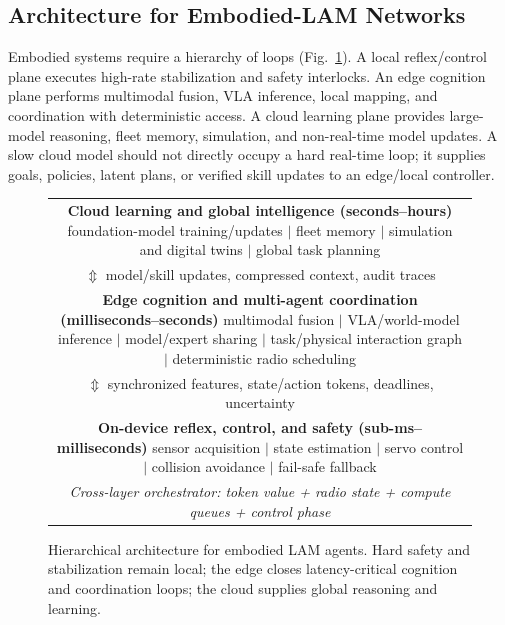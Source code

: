 \documentclass[letterpaper,journal]{IEEEtran}
\begin{document}
\subsection{Architecture for Embodied-LAM Networks}
Embodied systems require a hierarchy of loops (Fig.~\ref{fig:architecture}).
A local reflex/control plane executes high-rate stabilization and safety
interlocks. An edge cognition plane performs multimodal fusion, VLA inference,
local mapping, and coordination with deterministic access. A cloud learning
plane provides large-model reasoning, fleet memory, simulation, and
non-real-time model updates. A slow cloud model should not directly occupy a
hard real-time loop; it supplies goals, policies, latent plans, or verified
skill updates to an edge/local controller.

\begin{figure}[t]
\centering
\setlength{\tabcolsep}{3pt}
\renewcommand{\arraystretch}{1.2}
\begin{tabular}{c}
\fbox{\parbox{0.88\textwidth}{\centering
\textbf{Cloud learning and global intelligence (seconds--hours)}\\
foundation-model training/updates $\mid$ fleet memory $\mid$ simulation and
digital twins $\mid$ global task planning}}\\[-1pt]
$\Updownarrow$ \small model/skill updates, compressed context, audit traces\\[-1pt]
\fbox{\parbox{0.88\textwidth}{\centering
\textbf{Edge cognition and multi-agent coordination (milliseconds--seconds)}\\
multimodal fusion $\mid$ VLA/world-model inference $\mid$ model/expert sharing
$\mid$ task/physical interaction graph $\mid$ deterministic radio scheduling}}\\[-1pt]
$\Updownarrow$ \small synchronized features, state/action tokens, deadlines,
uncertainty\\[-1pt]
\fbox{\parbox{0.88\textwidth}{\centering
\textbf{On-device reflex, control, and safety (sub-ms--milliseconds)}\\
sensor acquisition $\mid$ state estimation $\mid$ servo control $\mid$
collision avoidance $\mid$ fail-safe fallback}}\\[3pt]
\multicolumn{1}{c}{\small
\textit{Cross-layer orchestrator: token value + radio state + compute queues +
control phase}}
\end{tabular}
\caption{Hierarchical architecture for embodied LAM agents. Hard safety and
stabilization remain local; the edge closes latency-critical cognition and
coordination loops; the cloud supplies global reasoning and learning.}
\label{fig:architecture}
\end{figure}
\end{document}

